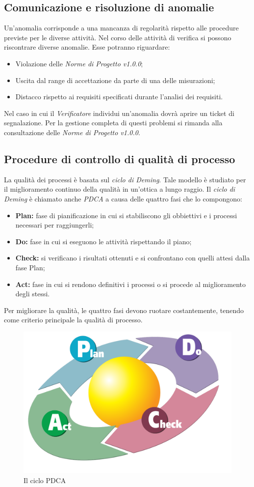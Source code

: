 \subsection{Comunicazione e risoluzione di anomalie}
Un'anomalia corrisponde a una mancanza di regolarità rispetto alle procedure previste per le diverse attività. Nel corso delle attività di verifica si possono riscontrare diverse anomalie. Esse potranno riguardare:
\begin{itemize}
	\item Violazione delle \textit{Norme di Progetto v1.0.0};
	\item Uscita dal range di accettazione da parte di una delle misurazioni;
	\item Distacco rispetto ai requisiti specificati durante l'analisi dei requisiti.
\end{itemize}
Nel caso in cui il \textit{Verificatore} individui un'anomalia dovrà aprire un \gls{ticket} di segnalazione. Per la gestione completa di questi problemi si rimanda alla consultazione delle \textit{Norme di Progetto v1.0.0}.

\subsection{Procedure di controllo di qualità di processo}
La qualità dei processi è basata sul \textit{ciclo di Deming}. Tale modello è studiato per il miglioramento continuo della qualità in un'ottica a lungo raggio.
Il \textit{ciclo di Deming} è chiamato anche \textit{\gls{PDCA}} a causa delle quattro fasi che lo compongono:
\begin{itemize}
	\item \textbf{Plan:} fase di pianificazione in cui si stabiliscono gli obbiettivi e i processi necessari per raggiungerli;
	\item \textbf{Do:} fase in cui si eseguono le attività rispettando il piano;
	\item \textbf{Check:} si verificano i risultati ottenuti e si confrontano con quelli attesi dalla fase Plan;
	\item \textbf{Act:} fase in cui si rendono definitivi i processi o si procede al miglioramento degli stessi. 
\end{itemize}
Per migliorare la qualità, le quattro fasi devono ruotare costantemente, tenendo come criterio principale la qualità di processo.
\begin{figure}[h]
\centering
\includegraphics[width=0.7\linewidth]{img/PDCA_Cycle}
\caption[Il ciclo PDCA]{Il ciclo PDCA}
\label{fig:PDCA_Cycle}
\end{figure}

